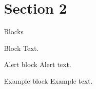 \documentclass[aspectratio=169]{beamer}
\begin{document}
    \section{Section 2}
    \begin{frame}{Blocks}
        \begin{block}{Block}
            Text.
        \end{block}
        \pause
        \begin{alertblock}{Alert block}
            Alert \alert{text}.
        \end{alertblock}
        \pause
        \begin{exampleblock}{Example block}
            Example \textcolor{example}{text}.
        \end{exampleblock}
    \end{frame}
    
\end{document}
